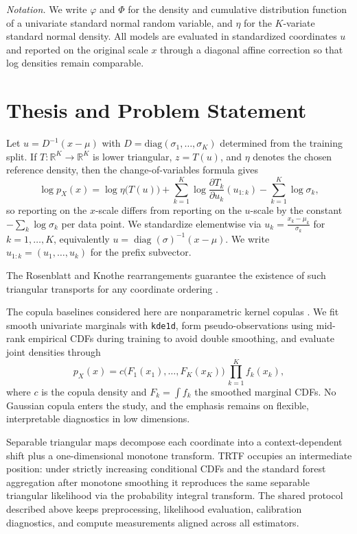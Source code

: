 \documentclass[11pt,a4paper,twoside]{book}\usepackage[]{graphicx}\usepackage[]{xcolor}
\begin{document}
\medskip
\noindent\textit{Notation.} We write $\varphi$ and $\Phi$ for the density and cumulative distribution function of a univariate standard normal random variable, and $\eta$ for the $K$-variate standard normal density. All models are evaluated in standardized coordinates $u$ and reported on the original scale $x$ through a diagonal affine correction so that log densities remain comparable.

\section{Thesis and Problem Statement}\label{sec:ch1-problem}

Let $u = D^{-1}(x - \mu)$ with $D = \mathrm{diag}(\sigma_1,\ldots,\sigma_K)$ determined from the training split. If $T: \mathbb{R}^K \to \mathbb{R}^K$ is lower triangular, $z = T(u)$, and $\eta$ denotes the chosen reference density, then the change-of-variables formula gives
\begin{equation}
  \log p_X(x) = \log \eta\big(T(u)\big) + \sum_{k=1}^{K} \log \frac{\partial T_k}{\partial u_k}(u_{1:k}) - \sum_{k=1}^{K} \log \sigma_k,
  \label{eq:ch1-change-of-variables}
\end{equation}
so reporting on the $x$-scale differs from reporting on the $u$-scale by the constant $-\sum_k \log \sigma_k$ per data point. We standardize elementwise via $u_k = \frac{x_k-\mu_k}{\sigma_k}$ for $k=1,\dots,K$, equivalently $u = \operatorname{diag}(\sigma)^{-1}(x-\mu)$. We write $u_{1:k} = (u_1,\dots,u_k)$ for the prefix subvector.

The Rosenblatt and Knothe rearrangements guarantee the existence of such triangular transports for any coordinate ordering \citep{rosenblatt1952remarks,knothe1957contributions}.

The copula baselines considered here are nonparametric kernel copulas \citep{nagler2017kdecopula}. We fit smooth univariate marginals with \texttt{kde1d}, form pseudo-observations using mid-rank empirical CDFs during training to avoid double smoothing, and evaluate joint densities through
\[
  p_X(x) = c\big(F_1(x_1),\ldots,F_K(x_K)\big)\, \prod_{k=1}^{K} f_k(x_k),
\]
where $c$ is the copula density and $F_k = \int f_k$ the smoothed marginal CDFs. No Gaussian copula enters the study, and the emphasis remains on flexible, interpretable diagnostics in low dimensions.

Separable triangular maps decompose each coordinate into a context-dependent shift plus a one-dimensional monotone transform. TRTF occupies an intermediate position: under strictly increasing conditional CDFs and the standard forest aggregation after monotone smoothing it reproduces the same separable triangular likelihood via the probability integral transform. The shared protocol described above keeps preprocessing, likelihood evaluation, calibration diagnostics, and compute measurements aligned across all estimators.
\end{document}
